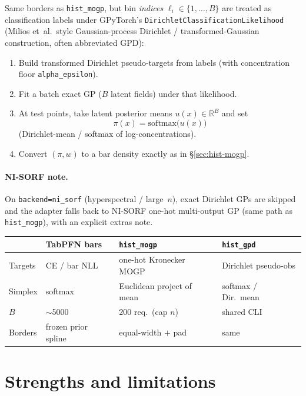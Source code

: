 \documentclass[11pt,a4paper]{article}
\newcommand{\R}{\mathbb{R}}
\theoremstyle{definition}
\begin{document}
Same borders as \texttt{hist\_mogp}, but bin \emph{indices}
$\ell_i\in\{1,\ldots,B\}$ are treated as classification labels under GPyTorch's
\texttt{DirichletClassificationLikelihood} (Milios et~al.\ style
Gaussian-process Dirichlet / transformed-Gaussian construction, often abbreviated
GPD):

\begin{enumerate}[leftmargin=1.4em]
\item Build transformed Dirichlet pseudo-targets from labels (with concentration
  floor \texttt{alpha\_epsilon}).
\item Fit a batch exact GP ($B$ latent fields) under that likelihood.
\item At test points, take latent posterior means $u(x)\in\R^B$ and set
  \[
    \pi(x)=\mathrm{softmax}\bigl(u(x)\bigr)
  \]
  (Dirichlet-mean / softmax of log-concentrations).
\item Convert $(\pi,w)$ to a bar density exactly as in \S\ref{sec:hist-mogp}.
\end{enumerate}

\paragraph{NI-SORF note.}
On \texttt{backend=ni\_sorf} (hyperspectral / large~$n$), exact Dirichlet GPs are
skipped and the adapter falls back to NI-SORF one-hot multi-output GP (same path
as \texttt{hist\_mogp}), with an explicit extras note.

\begin{center}
\renewcommand{\arraystretch}{1.15}
\begin{tabular}{@{}llll@{}}
\toprule
 & TabPFN bars & \texttt{hist\_mogp} & \texttt{hist\_gpd} \\
\midrule
Targets & CE / bar NLL & one-hot Kronecker MOGP & Dirichlet pseudo-obs \\
Simplex & softmax & Euclidean project of mean & softmax / Dir.\ mean \\
$B$ & $\sim$5000 & $200$ req.\ (cap $n$) & shared CLI \\
Borders & frozen prior spline & equal-width $+$ pad & same \\
\bottomrule
\end{tabular}
\end{center}

\section{Strengths and limitations}
\label{sec:strengths}
\end{document}
